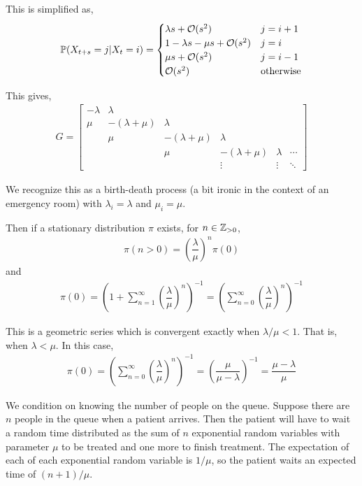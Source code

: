 \begin{solution}[Solution]
This is simplified as,
\begin{align*}
    \mathbb{P}(X_{t+s}=j | X_t = i) = 
    \begin{cases}
        \lambda s + \mathcal{O}(s^2) & j=i+1 \\
        1-\lambda s -\mu s +\mathcal{O}(s^2) & j=i \\
        \mu s + \mathcal{O}(s^2) & j=i-1 \\
        \mathcal{O}(s^2) & \text{otherwise}
    \end{cases}
\end{align*}


This gives,
\begin{align*}
    G = 
    \left[\begin{array}{cccccc}
        -\lambda & \lambda \\
        \mu & -(\lambda+\mu) & \lambda \\
        &  \mu & -(\lambda+\mu) & \lambda \\
        & &  \mu & -(\lambda+\mu) & \lambda & \cdots\\
        & & & \vdots & \vdots & \ddots 
    \end{array}\right]
\end{align*}

We recognize this as a birth-death process (a bit ironic in the context of an emergency room) with \( \lambda_i = \lambda \) and \( \mu_i=\mu \).

Then if a stationary distribution \( \pi \) exists, for \( n\in\mathbb{Z}_{>0} \),
\begin{align*}
    \pi(n>0) = \left(\dfrac{\lambda}{\mu}\right)^{n} \pi(0)
\end{align*}
and
\begin{align*}
    \pi(0) = \left( 1+\sum_{n=1}^{\infty} \left( \dfrac{\lambda}{\mu} \right)^n \right)^{-1} = \left( \sum_{n=0}^{\infty} \left( \dfrac{\lambda}{\mu} \right)^n \right)^{-1}
\end{align*}

This is a geometric series which is convergent exactly when \( \lambda/\mu < 1 \). That is, when \( \lambda < \mu \). In this case,
\begin{align*}
    \pi(0) = \left( \sum_{n=0}^{\infty} \left( \dfrac{\lambda}{\mu} \right)^n \right)^{-1} = \left(\dfrac{\mu}{\mu-\lambda}\right)^{-1} = \dfrac{\mu-\lambda}{\mu}
\end{align*}


We condition on knowing the number of people on the queue. Suppose there are \( n \) people in the queue when a patient arrives. Then the patient will have to wait a random time distributed as the sum of \( n \) exponential random variables with parameter \( \mu \) to be treated and one more to finish treatment. The expectation of each of each exponential random variable is \( 1/\mu \), so the patient waits an expected time of \( (n+1)/\mu \).


\end{solution}
